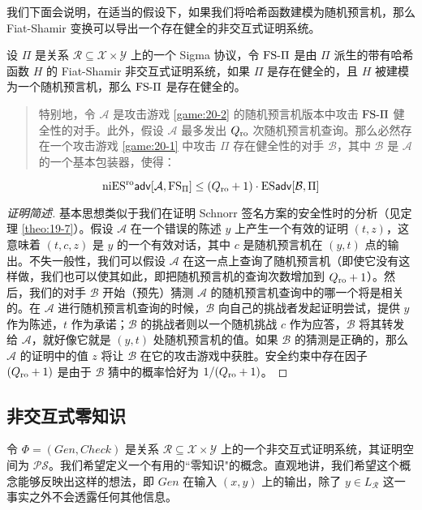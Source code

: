 我们下面会说明，在适当的假设下，如果我们将哈希函数建模为随机预言机，那么 Fiat-Shamir 变换可以导出一个存在健全的非交互式证明系统。

\begin{theorem}
设 $\Pi$ 是关系 $\mathcal{R}\subseteq\mathcal{X}\times\mathcal{Y}$ 上的一个 Sigma 协议，令 ${\rm FS}\text{-}\Pi$ 是由 $\Pi$ 派生的带有哈希函数 $H$ 的 Fiat-Shamir 非交互式证明系统，如果 $\Pi$ 是存在健全的，且 $H$ 被建模为一个随机预言机，那么 ${\rm FS}\text{-}\Pi$ 是存在健全的。
\begin{quote}
特别地，令 $\mathcal{A}$ 是攻击游戏 \ref{game:20-2} 的随机预言机版本中攻击 ${\rm FS}\text{-}\Pi$ 健全性的对手。此外，假设 $\mathcal{A}$ 最多发出 $Q_{\rm ro}$ 次随机预言机查询。那么必然存在一个攻击游戏 \ref{game:20-1} 中攻击 $\Pi$ 存在健全性的对手 $\mathcal{B}$，其中 $\mathcal{B}$ 是 $\mathcal{A}$ 的一个基本包装器，使得：
\end{quote}
\[
{\rm niES^{ro}\mathsf{adv}}[\mathcal{A},{\rm FS}_\Pi]\leq(Q_{\rm ro}+1)\cdot{\rm ES\mathsf{adv}}[\mathcal{B},\Pi]
\]
\end{theorem}

\begin{proof}[证明简述]
基本思想类似于我们在证明 Schnorr 签名方案的安全性时的分析（见定理 \ref{theo:19-7}）。假设 $\mathcal{A}$ 在一个错误的陈述 $y$ 上产生一个有效的证明 $(t,z)$，这意味着 $(t,c,z)$ 是 $y$ 的一个有效对话，其中 $c$ 是随机预言机在 $(y,t)$ 点的输出。不失一般性，我们可以假设 $\mathcal{A}$ 在这一点上查询了随机预言机（即使它没有这样做，我们也可以使其如此，即把随机预言机的查询次数增加到 $Q_{\rm ro}+1$）。然后，我们的对手 $\mathcal{B}$ 开始（预先）猜测 $\mathcal{A}$ 的随机预言机查询中的哪一个将是相关的。在 $\mathcal{A}$ 进行随机预言机查询的时候，$\mathcal{B}$ 向自己的挑战者发起证明尝试，提供 $y$ 作为陈述，$t$ 作为承诺；$\mathcal{B}$ 的挑战者则以一个随机挑战 $c$ 作为应答，$\mathcal{B}$ 将其转发给 $\mathcal{A}$，就好像它就是 $(y,t)$ 处随机预言机的值。如果 $\mathcal{B}$ 的猜测是正确的，那么 $\mathcal{A}$ 的证明中的值 $z$ 将让 $\mathcal{B}$ 在它的攻击游戏中获胜。安全约束中存在因子 $(Q_{\rm ro}+1)$ 是由于 $\mathcal{B}$ 猜中的概率恰好为 ${1}/{(Q_{\rm ro}+1)}$。
\end{proof}

\subsection{非交互式零知识}

令 $\Phi=(Gen,Check)$ 是关系 $\mathcal{R}\subseteq\mathcal{X}\times\mathcal{Y}$ 上的一个非交互式证明系统，其证明空间为 $\mathcal{PS}$。我们希望定义一个有用的``零知识"的概念。直观地讲，我们希望这个概念能够反映出这样的想法，即 $Gen$ 在输入 $(x,y)$ 上的输出，除了 $y\in L_{\mathcal R}$ 这一事实之外不会透露任何其他信息。

